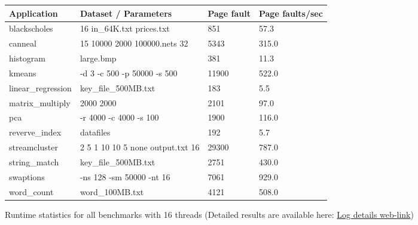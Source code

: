 \begin{figure}[t]
\centering
\myfontsize
{
\begin{tabular}{m{1.6cm}|m{3.4cm}| m{1.5cm}|m{1.4cm}}
   { Application} & Dataset / Parameters & Page fault & Page faults/sec\\
  \hline \hline
    blackscholes& 16 in\_64K.txt prices.txt &851& 57.3 \\
    canneal& 15 10000 2000 100000.nets 32 & 5343& 315.0 \\
    histogram& large.bmp & 381& 11.3  \\
    kmeans& -d 3 -c 500 -p 50000 -s 500 & 11900& 522.0  \\
    linear\_regression& key\_file\_500MB.txt & 183& 5.5  \\
    matrix\_multiply& 2000 2000 & 2101& 97.0  \\
    pca& -r 4000 -c 4000 -s 100 & 1900& 116.0\\
    reverve\_index & datafiles & 192& 5.7  \\
    streamcluster& 2 5 1 10 10 5 none output.txt 16 & 29300& 787.0\\
    string\_match &key\_file\_500MB.txt & 2751& 430.0\\
    swaptions & -ns 128 -sm 50000 -nt 16  & 7061& 929.0 \\
    word\_count& word\_100MB.txt	 & 4121& 508.0  \\

\hline
\end{tabular}
}


\caption{\label{tab:apps} Runtime statistics for all benchmarks with 16 threads (Detailed results are available here: \href{https://mic92.github.io/inspector/index.html\#measurement_table}{Log details web-link}) }                                                                                                                                  


\end{figure}
